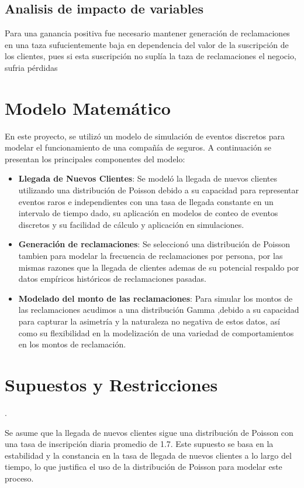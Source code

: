 \documentclass{article}
\begin{document}
\subsection{Analisis de impacto de variables}
Para una ganancia positiva fue necesario mantener generaci\'{o}n de reclamaciones en una taza sufucientemente baja en dependencia del valor de la suscripci\'{o}n de los clientes, pues si esta suscripci\'{o}n no supl\'{i}a la taza de reclamaciones el negocio, sufria p\'{e}rdidas

\section{Modelo Matemático}
En este proyecto, se utilizó un modelo de simulación de eventos discretos para modelar el funcionamiento de una compañía de seguros. A continuación se presentan los principales componentes del modelo:

\begin{itemize}
  \item \textbf{Llegada de Nuevos Clientes}: Se modeló la llegada de nuevos clientes utilizando una distribución de Poisson debido a su capacidad para representar eventos raros e independientes con una tasa de llegada constante en un intervalo de tiempo dado, su aplicación en modelos de conteo de eventos discretos y su facilidad de cálculo y aplicación en simulaciones.
  \item \textbf{Generación de reclamaciones}: Se seleccion\'{o} una distribución de Poisson tambien para modelar la frecuencia de reclamaciones por persona, por las mismas razones que la llegada de clientes ademas de su potencial respaldo por datos empíricos históricos de reclamaciones pasadas.
  \item \textbf{Modelado del monto de las reclamaciones}: Para simular los montos de las reclamaciones acudimos a una distribución Gamma ,debido a su capacidad para capturar la asimetría y la naturaleza no negativa de estos datos, así como su flexibilidad en la modelización de una variedad de comportamientos en los montos de reclamación.

\end{itemize}

\section{Supuestos y Restricciones}.

    Se asume que la llegada de nuevos clientes sigue una distribución de Poisson con una tasa de inscripción diaria promedio de 1.7. Este supuesto se basa en la estabilidad y la constancia en la tasa de llegada de nuevos clientes a lo largo del tiempo, lo que justifica el uso de la distribución de Poisson para modelar este proceso.
\end{document}
